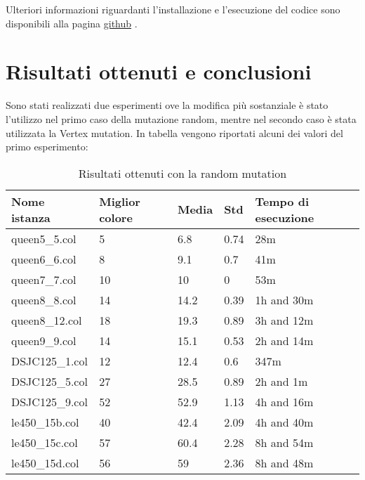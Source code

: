 \documentclass[12pt]{article}
\begin{document}
\begin{enumerate}
\noindent Ulteriori informazioni riguardanti l'installazione e l'esecuzione del codice sono disponibili alla pagina \href{https://github.com/borgesis95/GCP-with-Genetic-algorithm} {github} .


    

\section{Risultati ottenuti e conclusioni}

Sono stati realizzati due esperimenti ove la modifica più sostanziale è stato l'utilizzo nel primo caso della mutazione random, mentre nel secondo caso è stata utilizzata la Vertex mutation. In tabella vengono riportati alcuni dei valori del primo esperimento:




\begin{table}[htbp]
\begin{center}
\begin{tabular}{|l|l|l|l|l|} 
 \toprule Nome istanza  & Miglior colore & Media & Std  & Tempo di esecuzione \\ 
\midrule
queen5\_5.col  & 5              & 6.8   & 0.74 & 28m                 \\ 
queen6\_6.col  & 8              & 9.1   & 0.7  & 41m                 \\ 
queen7\_7.col  & 10             & 10 & 0 & 53m          \\ 
queen8\_8.col  & 14             & 14.2  & 0.39 & 1h and 30m          \\ 
queen8\_12.col & 18             & 19.3  & 0.89 & 3h and 12m          \\ 
queen9\_9.col & 14             & 15.1  & 0.53 & 2h and 14m          \\ 
DSJC125\_1.col & 12             & 12.4  & 0.6 & 347m       \\ 
DSJC125\_5.col & 27             & 28.5  & 0.89 & 2h and 1m      \\ 
DSJC125\_9.col & 52             & 52.9  & 1.13 & 4h and 16m      \\ 
le450\_15b.col & 40             & 42.4  & 2.09 & 4h and 40m      \\ 
le450\_15c.col & 57             & 60.4  & 2.28 & 8h and 54m      \\ 
le450\_15d.col & 56             & 59  & 2.36 & 8h and 48m      \\ 
\bottomrule
\end{tabular}
\caption{\label{table:tabella1}Risultati ottenuti con la random mutation}
\end{center}
\end{table}


\end{enumerate}
\end{document}
